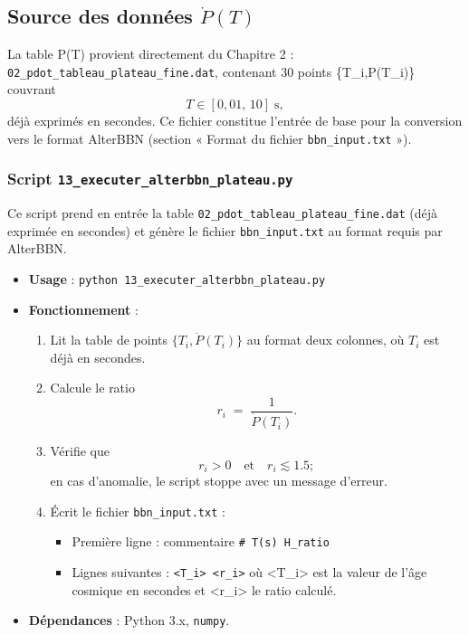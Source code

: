 \subsection{Source des données \(\dot P(T)\)}

La table \dot P(T) provient directement du Chapitre 2 :
\texttt{02_pdot_tableau_plateau_fine.dat}, contenant 30 points \{T_i,\dot P(T_i)\} couvrant
\[
  T\in[0{,}01,\,10]\;\mathrm{s},
\]
déjà exprimés en secondes.
Ce fichier constitue l’entrée de base pour la conversion vers le format AlterBBN (section « Format du fichier \texttt{bbn\_input.txt} »).

\subsubsection{Script \texttt{13\_executer\_alterbbn\_plateau.py}}

Ce script prend en entrée la table \texttt{02\_pdot\_tableau\_plateau\_fine.dat} (déjà exprimée en secondes) et génère le fichier \texttt{bbn\_input.txt} au format requis par AlterBBN.

\begin{itemize}
  \item \textbf{Usage} :
    \verb|python 13_executer_alterbbn_plateau.py|

  \item \textbf{Fonctionnement} :
    \begin{enumerate}
      \item Lit la table de points \(\{T_i,\dot P(T_i)\}\) au format deux colonnes, où \(T_i\) est déjà en secondes.
      \item Calcule le ratio
        \[
          r_i \;=\;\frac{1}{\dot P(T_i)}.
        \]
      \item Vérifie que
        \[
          r_i > 0
          \quad\text{et}\quad
          r_i \lesssim 1.5;
        \]
        en cas d’anomalie, le script stoppe avec un message d’erreur.
      \item Écrit le fichier \texttt{bbn\_input.txt} :
        \begin{itemize}
          \item Première ligne : commentaire
            \verb|# T(s) H_ratio|
          \item Lignes suivantes :
            \verb|<T_i> <r_i>|
            où <T_i> est la valeur de l’âge cosmique en secondes et <r_i> le ratio calculé.
        \end{itemize}
    \end{enumerate}

  \item \textbf{Dépendances} :
    Python 3.x, \texttt{numpy}.
\end{itemize}

